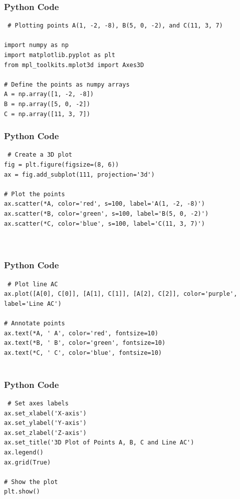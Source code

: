 \documentclass{beamer}
\begin{document}
\begin{frame}[fragile]
    \frametitle{Python Code}
    \begin{lstlisting}
 # Plotting points A(1, -2, -8), B(5, 0, -2), and C(11, 3, 7)
 
import numpy as np
import matplotlib.pyplot as plt
from mpl_toolkits.mplot3d import Axes3D

# Define the points as numpy arrays
A = np.array([1, -2, -8])
B = np.array([5, 0, -2])
C = np.array([11, 3, 7])
\end{lstlisting}
\end{frame}

\begin{frame}[fragile]
    \frametitle{Python Code}

    \begin{lstlisting}
 # Create a 3D plot
fig = plt.figure(figsize=(8, 6))
ax = fig.add_subplot(111, projection='3d')

# Plot the points
ax.scatter(*A, color='red', s=100, label='A(1, -2, -8)')
ax.scatter(*B, color='green', s=100, label='B(5, 0, -2)')
ax.scatter(*C, color='blue', s=100, label='C(11, 3, 7)')



    \end{lstlisting}
\end{frame}

\begin{frame}[fragile]
    \frametitle{Python Code}

    \begin{lstlisting}
 # Plot line AC
ax.plot([A[0], C[0]], [A[1], C[1]], [A[2], C[2]], color='purple', label='Line AC')

# Annotate points
ax.text(*A, ' A', color='red', fontsize=10)
ax.text(*B, ' B', color='green', fontsize=10)
ax.text(*C, ' C', color='blue', fontsize=10)


    \end{lstlisting}
\end{frame}

\begin{frame}[fragile]
    \frametitle{Python Code}

    \begin{lstlisting}
 # Set axes labels
ax.set_xlabel('X-axis')
ax.set_ylabel('Y-axis')
ax.set_zlabel('Z-axis')
ax.set_title('3D Plot of Points A, B, C and Line AC')
ax.legend()
ax.grid(True)

# Show the plot
plt.show()



\end{lstlisting}
\end{frame}
\end{document}

